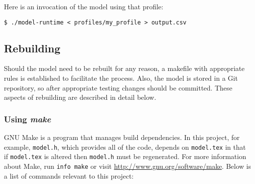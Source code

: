 \documentclass{article}
\begin{document}
        Here is an invocation of the model using that profile:

        \begin{verbatim}
$ ./model-runtime < profiles/my_profile > output.csv
        \end{verbatim}

    \subsection{Rebuilding}
      \label{sec:rebuilding}
    
      Should the model need to be rebuilt for any reason, a makefile with
      appropriate rules is established to facilitate the process. Also, the
      model is stored in a Git repository, so after appropriate testing changes
      should be committed. These aspects of rebuilding are described in detail
      below.

      \subsubsection{Using {\em make}}
        \label{sec:make}

        GNU Make is a program that manages build dependencies. In this project,
        for example, \verb|model.h|, which provides all of the code, depends on
        \verb|model.tex| in that if \verb|model.tex| is altered then
        \verb|model.h| must be regenerated. For more information about Make, run
        \verb|info make| or visit \url{http://www.gnu.org/software/make}. Below
        is a list of commands relevant to this project:
\end{document}
